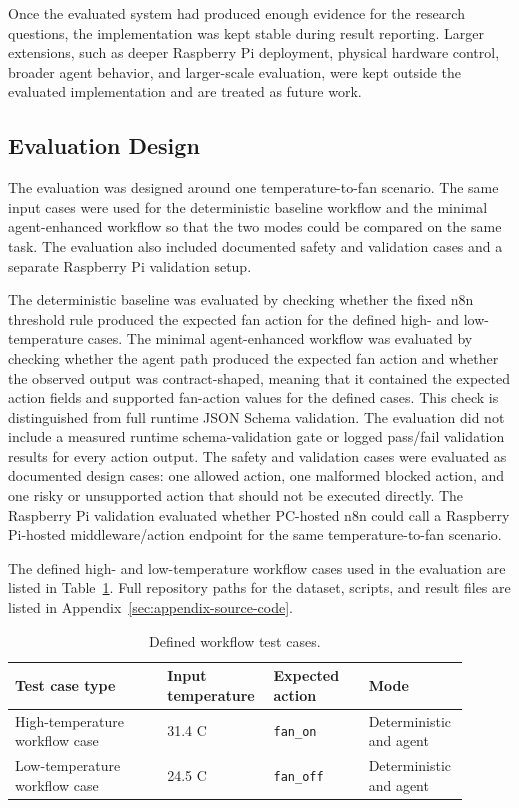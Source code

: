 Once the evaluated system had produced enough evidence for the research questions, the implementation was kept stable during result reporting. Larger extensions, such as deeper Raspberry Pi deployment, physical hardware control, broader agent behavior, and larger-scale evaluation, were kept outside the evaluated implementation and are treated as future work.



\subsection{Evaluation Design}\label{subsec:evaluation-design}

The evaluation was designed around one temperature-to-fan scenario. The same input cases were used for the deterministic baseline workflow and the minimal agent-enhanced workflow so that the two modes could be compared on the same task. The evaluation also included documented safety and validation cases and a separate Raspberry Pi validation setup.

The deterministic baseline was evaluated by checking whether the fixed n8n threshold rule produced the expected fan action for the defined high- and low-temperature cases. The minimal agent-enhanced workflow was evaluated by checking whether the agent path produced the expected fan action and whether the observed output was contract-shaped, meaning that it contained the expected action fields and supported fan-action values for the defined cases. This check is distinguished from full runtime JSON Schema validation. The evaluation did not include a measured runtime schema-validation gate or logged pass/fail validation results for every action output. The safety and validation cases were evaluated as documented design cases: one allowed action, one malformed blocked action, and one risky or unsupported action that should not be executed directly. The Raspberry Pi validation evaluated whether PC-hosted n8n could call a Raspberry Pi-hosted middleware/action endpoint for the same temperature-to-fan scenario.

The defined high- and low-temperature workflow cases used in the evaluation are listed in Table~\ref{tab:method-test-cases}. Full repository paths for the dataset, scripts, and result files are listed in Appendix~\ref{sec:appendix-source-code}.

\begin{table}[H]
  \centering
  \caption{Defined workflow test cases.}
  \label{tab:method-test-cases}
  \begin{tabular}{@{}p{0.32\linewidth}p{0.22\linewidth}p{0.20\linewidth}p{0.16\linewidth}@{}}
    \toprule
    Test case type & Input temperature & Expected action & Mode \\
    \midrule
    High-temperature workflow case & 31.4 C & \texttt{fan\_on} & Deterministic and agent \\
    Low-temperature workflow case & 24.5 C & \texttt{fan\_off} & Deterministic and agent \\
    \bottomrule
  \end{tabular}
\end{table}

